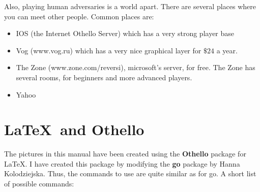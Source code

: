 \documentclass[12pt,twoside]{report}
\begin{document}
Also, playing human adversaries is a world apart. There are
several places where you can meet other people. Common places are:
\begin{itemize}
\item
IOS (the Internet Othello Server) which has a very strong player
base
\item Vog (www.vog.ru) which has a very nice graphical layer for
$\$24$ a year.
\item The Zone (www.zone.com/reversi), microsoft's server, for
free. The Zone has several rooms, for beginners and more advanced players.
\item Yahoo
\end{itemize}


\chapter{\LaTeX\ and Othello}
The pictures in this manual have been created using the
\textbf{Othello} package for \LaTeX. I have created this package
by modifying the \textbf{go} package by Hanna Kolodziejska. Thus,
the commands to use are quite similar as for go.  A short list of
possible commands:
\end{document}
